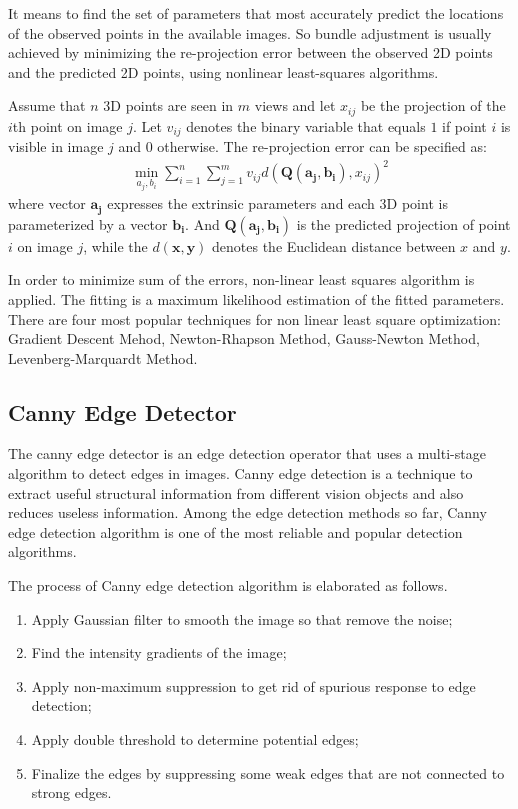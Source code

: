 \documentclass[paper=a4, fontsize=14pt]{scrartcl}
\numberwithin{equation}{section}                %
\numberwithin{figure}{section}                  %
\numberwithin{table}{section}                           %
\begin{document}
It means to find the set of parameters that most accurately predict the locations of the observed points in the available images. 
So bundle adjustment is usually achieved by minimizing the re-projection error between the observed 2D points and the predicted 2D points, using nonlinear least-squares algorithms.

Assume that $n$ 3D points are seen in $m$ views and let $x_{ij}$ be the projection of the $i$th point on image $j$.
Let $v_{ij}$ denotes the binary variable that equals $1$ if point $i$ is visible in image $j$ and $0$ otherwise.
The re-projection error can be specified as:
\begin{align*}
    \min_{a_j, b_i}\sum_{i=1}^n\sum_{j=1}^m v_{ij} d(\mathbf{Q}(\mathbf{a_j}, \mathbf{b_i}), x_{ij})^2
\end{align*}
where vector $\mathbf{a_j}$ expresses the extrinsic parameters and each 3D point is parameterized by a vector $\mathbf{b_i}$.
And $\mathbf{Q}(\mathbf{a_j}, \mathbf{b_i})$ is the predicted projection of point $i$ on image $j$, while the $d(\mathbf{x}, \mathbf{y})$ denotes the Euclidean distance between $x$ and $y$.

In order to minimize sum of the errors, non-linear least squares algorithm is applied. The fitting is a maximum likelihood estimation of the fitted parameters. There are four most popular techniques for non linear least square optimization: Gradient Descent Mehod, Newton-Rhapson Method, Gauss-Newton Method, Levenberg-Marquardt Method.

\subsection{Canny Edge Detector}
The canny edge detector is an edge detection operator that uses a multi-stage algorithm to detect edges in images.
Canny edge detection is a technique to extract useful structural information from different vision objects and also reduces useless information.
Among the edge detection methods so far, Canny edge detection algorithm is one of the most reliable and popular detection algorithms.

The process of Canny edge detection algorithm is elaborated as follows.
\begin{enumerate}
    \item Apply Gaussian filter to smooth the image so that remove the noise;
    \item Find the intensity gradients of the image;
    \item Apply non-maximum suppression to get rid of spurious response to edge detection;
    \item Apply double threshold to determine potential edges;
    \item Finalize the edges by suppressing some weak edges that are not connected to strong edges.
\end{enumerate}
\end{document}
